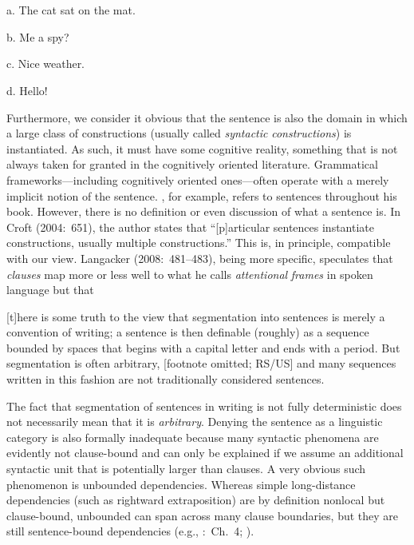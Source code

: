 \ea%
    \label{ex:key:8}
    \gll\\
        \\
    \glt
    \z

          a.  The cat sat on the mat.



b.  Me a spy?



c.  Nice weather.



d.  Hello!



Furthermore, we consider it obvious that the sentence is also the domain in which a large class of constructions (usually called \textit{syntactic} \textit{constructions}) is instantiated. As such, it must have some cognitive reality, something that is not always taken for granted in the cognitively oriented literature. Grammatical frameworks—including cognitively oriented ones—often operate with a merely implicit notion of the sentence. \citet{Croft2001}, for example, refers to sentences throughout his book. However, there is no definition or even discussion of what a sentence is. In Croft (2004:~651), the author states that “[p]articular sentences instantiate constructions, usually multiple constructions.” This is, in principle, compatible with our view. Langacker (2008:~481–483), being more specific, speculates that \textit{clauses} map more or less well to what he calls \textit{attentional} \textit{frames} in spoken language but that



[t]here is some truth to the view that segmentation into sentences is merely a convention of writing; a sentence is then definable (roughly) as a sequence bounded by spaces that begins with a capital letter and ends with a period. But segmentation is often arbitrary, [footnote omitted; RS/US] and many sequences written in this fashion are not traditionally considered sentences.



The fact that segmentation of sentences in writing is not fully deterministic does not necessarily mean that it is \textit{arbitrary}. Denying the sentence as a linguistic category is also formally inadequate because many syntactic phenomena are evidently not clause-bound and can only be explained if we assume an additional syntactic unit that is potentially larger than clauses. A very obvious such phenomenon is unbounded dependencies. Whereas simple long-distance dependencies (such as rightward extraposition) are by definition nonlocal but clause-bound, unbounded can span across many clause boundaries, but they are still sentence-bound dependencies (e.g., \citealt{PollardSag1994}:~Ch.~4; \citealt{LevineHukari2006}).



